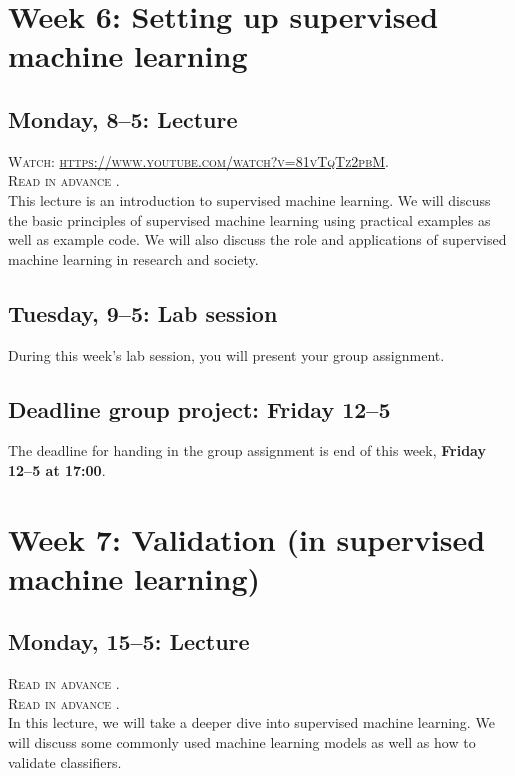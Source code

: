 \section*{Week 6: Setting up supervised machine learning}

\subsection*{Monday, 8--5: Lecture}
\textsc{ Watch: \url{https://www.youtube.com/watch?v=81vTqTz2pbM}.}\\
\textsc{ Read in advance \cite{van_zoonen_social_2016}.}\\

This lecture is an introduction to supervised machine learning. We will discuss the basic principles of supervised machine learning using practical examples as well as example code. We will also discuss the role and applications of supervised machine learning in research and society.

\subsection*{Tuesday, 9--5: Lab session}
During this week's lab session, you will present your group assignment.

\subsection*{Deadline group project: Friday 12--5}
The deadline for handing in the group assignment is end of this week, \textbf{Friday 12--5 at 17:00}.

\section*{Week 7: Validation (in supervised machine learning)}
\subsection*{Monday, 15--5: Lecture}
\textsc{ Read in advance \cite{jordan_mitchell}.} \\
\textsc{ Read in advance \cite{meppelink_reliable_2021}.}\\

In this lecture, we will take a deeper dive into supervised machine learning. We will discuss some commonly used machine learning models as well as how to validate classifiers.

